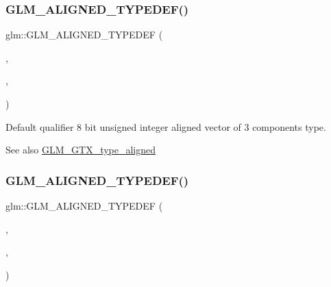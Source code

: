 \subsubsection{\texorpdfstring{G\+L\+M\+\_\+\+A\+L\+I\+G\+N\+E\+D\+\_\+\+T\+Y\+P\+E\+D\+E\+F()}{GLM\_ALIGNED\_TYPEDEF()}\hspace{0.1cm}{\footnotesize\ttfamily [123/209]}}
{\footnotesize\ttfamily glm\+::\+G\+L\+M\+\_\+\+A\+L\+I\+G\+N\+E\+D\+\_\+\+T\+Y\+P\+E\+D\+EF (\begin{DoxyParamCaption}\item[{\mbox{\hyperlink{group__gtc__type__precision_gaa86b325e581afdc643495fbe428c1f1b}{u8vec3}}}]{,  }\item[{aligned\+\_\+u8vec3}]{,  }\item[{4}]{ }\end{DoxyParamCaption})}

Default qualifier 8 bit unsigned integer aligned vector of 3 components type. \begin{DoxySeeAlso}{See also}
\mbox{\hyperlink{group__gtx__type__aligned}{G\+L\+M\+\_\+\+G\+T\+X\+\_\+type\+\_\+aligned}} 
\end{DoxySeeAlso}
\mbox{\label{group__gtx__type__aligned_ga8b8588bb221448f5541a858903822a57}} 
\subsubsection{\texorpdfstring{G\+L\+M\+\_\+\+A\+L\+I\+G\+N\+E\+D\+\_\+\+T\+Y\+P\+E\+D\+E\+F()}{GLM\_ALIGNED\_TYPEDEF()}\hspace{0.1cm}{\footnotesize\ttfamily [124/209]}}
{\footnotesize\ttfamily glm\+::\+G\+L\+M\+\_\+\+A\+L\+I\+G\+N\+E\+D\+\_\+\+T\+Y\+P\+E\+D\+EF (\begin{DoxyParamCaption}\item[{\mbox{\hyperlink{group__gtc__type__precision_ga6c8841fa492bd5b1078b171452fd6974}{u8vec4}}}]{,  }\item[{aligned\+\_\+u8vec4}]{,  }\item[{4}]{ }\end{DoxyParamCaption})}

